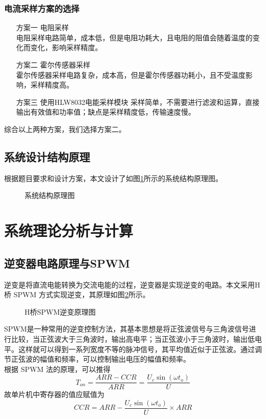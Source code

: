 \documentclass[a4paper,12pt]{article}
\begin{document}
\subsubsection{电流采样方案的选择}
\begin{enumerate}
    \item[方案一] 电阻采样 \\ 电阻采样电路简单，成本低，但是电阻功耗大，且电阻的阻值会随着温度的变化而变化，影响采样精度。
    \item[方案二] 霍尔传感器采样 \\ 霍尔传感器采样电路复杂，成本高，但是霍尔传感器功耗小，且不受温度影响，采样精度高。
    \item[方案三] 使用HLW8032电能采样模块  采样简单，不需要进行滤波和运算，直接输出有效值和功率值；缺点是采样精度低，传输速度慢。
\end{enumerate}
综合以上两种方案，我们选择方案二。

\subsection{系统设计结构原理}
根据题目要求和设计方案，本文设计了如图\ref{fig2}所示的系统结构原理图。
\begin{figure}[htbp]
\centering
\caption{系统结构原理图}
\label{fig2}
\end{figure}

\newpage

\section{系统理论分析与计算}
\subsection{逆变器电路原理与SPWM}
逆变是将直流电能转换为交流电能的过程，逆变器是实现逆变的电路。本文采用H桥 SPWM 方式实现逆变，其原理如图\ref{fig3}所示。
\begin{figure}[htbp]
\centering
\caption{H桥SPWM逆变原理图}
\label{fig3}
\end{figure}

SPWM是一种常用的逆变控制方法，其基本思想是将正弦波信号与三角波信号进行比较，当正弦波大于三角波时，输出高电平；当正弦波小于三角波时，输出低电平。这样就可以得到一系列宽度不等的脉冲信号，其平均值近似于正弦波。通过调节正弦波的幅值和频率，可以控制输出电压的幅值和频率。
\\
根据 SPWM 法的原理，可以推得
\begin{equation*}
T_{on}=\frac{ARR-CCR}{ARR}=\frac{U_c\sin(\omega t_o)}{U}
\end{equation*}
故单片机中寄存器的值应赋值为
\begin{equation*}
CCR=ARR-\frac{U_c\sin (\omega t_o)}{U}\times ARR
\end{equation*}
\end{document}

